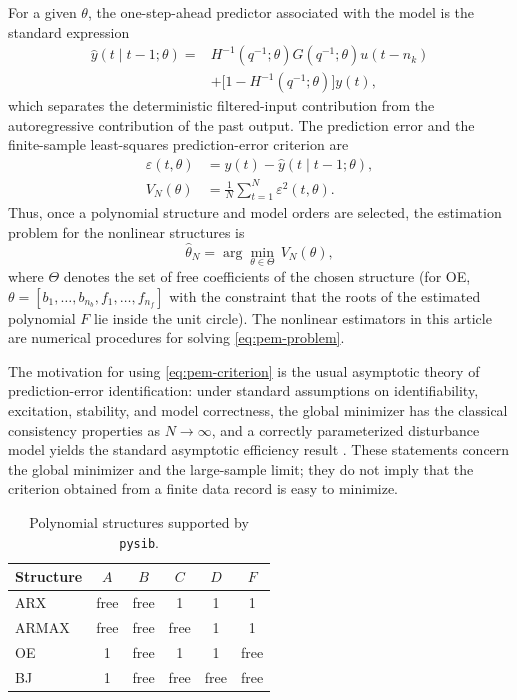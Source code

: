 \documentclass{ifacconf}
\begin{document}
For a given \(\theta\), the one-step-ahead predictor associated with the model
is the standard expression
\begin{equation}
  \begin{aligned}
  \hat y(t\mid t-1;\theta)= &
  H^{-1}(q^{-1};\theta)G(q^{-1};\theta)u(t-n_k) \\
  & +\bigl[1-H^{-1}(q^{-1};\theta)\bigr]y(t),
  \end{aligned}
  \label{eq:predictor}
\end{equation}
which separates the deterministic filtered-input contribution from the
autoregressive contribution of the past output.  The prediction error
and the finite-sample least-squares prediction-error criterion are
\begin{align}
  \varepsilon(t,\theta) &= y(t)-\hat y(t\mid t-1;\theta), \\
  V_N(\theta) &= \frac{1}{N}\sum_{t=1}^{N}\varepsilon^2(t,\theta).
  \label{eq:pem-criterion}
\end{align}
Thus, once a polynomial structure and model orders are selected, the estimation
problem for the nonlinear structures is
\begin{equation}
  \hat\theta_N = \arg\min_{\theta\in\Theta}\, V_N(\theta),
  \label{eq:pem-problem}
\end{equation}
where \(\Theta\) denotes the set of free coefficients of the chosen structure
(for OE, \(\theta=[b_1,\dots,b_{n_b},f_1,\dots,f_{n_f}]\) with the constraint
that the roots of the estimated polynomial \(F\) lie inside the unit circle).
The nonlinear estimators in this article are numerical procedures for solving
\eqref{eq:pem-problem}.

The motivation for using \eqref{eq:pem-criterion} is the usual asymptotic
theory of prediction-error identification: under standard assumptions on
identifiability, excitation, stability, and model correctness, the global
minimizer has the classical consistency properties as \(N\to\infty\), and a
correctly parameterized disturbance model yields the standard asymptotic
efficiency result \citep{ljung1999,soderstrom1989,ljung1978}.  These statements concern
the global minimizer and the large-sample limit; they do not imply that the
criterion obtained from a finite data record is easy to minimize.

\begin{table}[t]
  \caption{Polynomial structures supported by \texttt{pysib}.}
  \label{tab:structures}
  \centering
  \footnotesize
  \begin{tabular}{lccccc}
    \toprule
    Structure & \(A\) & \(B\) & \(C\) & \(D\) & \(F\) \\
    \midrule
    ARX   & free & free & 1    & 1    & 1 \\
    ARMAX & free & free & free & 1    & 1 \\
    OE    & 1    & free & 1    & 1    & free \\
    BJ    & 1    & free & free & free & free \\
    \bottomrule
  \end{tabular}
\end{table}
\end{document}
